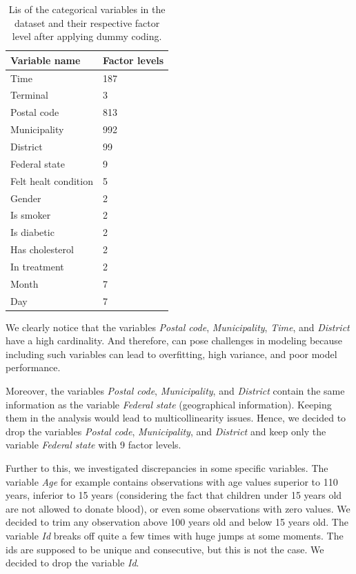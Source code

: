 \documentclass[12 pt]{scrartcl}
\numberwithin{equation}{section}
\begin{document}
\begin{table}[H]
    \centering
    \begin{tabular}{l||l}
    
    \textbf{Variable name} & \textbf{Factor levels} \\ \hline
    Time & 187 \\ \hline
    Terminal & 3 \\ \hline
    Postal code & 813 \\ \hline
    Municipality & 992 \\ \hline
    District & 99 \\ \hline
    Federal state & 9 \\ \hline
    Felt healt condition & 5 \\ \hline
    Gender & 2 \\ \hline
    Is smoker & 2 \\ \hline
    Is diabetic & 2 \\ \hline
    Has cholesterol & 2 \\ \hline
    In treatment & 2 \\ \hline
    Month & 7 \\ \hline
    Day & 7 \\ \hline

    \end{tabular}
    \caption{Lis of the categorical variables in the dataset and their respective factor level after applying dummy coding.}
    \label{tab:categorical}
    \end{table}

We clearly notice that the variables \textit{Postal code},  
\textit{Municipality}, \textit{Time}, and \textit{District} have a high cardinality.
And therefore, can pose challenges in modeling because including such variables can lead to overfitting, 
high variance, and poor model performance.

Moreover, the variables \textit{Postal code}, \textit{Municipality}, and \textit{District} 
contain the same information as the variable \textit{Federal state} (geographical information).
Keeping them in the analysis would lead to multicollinearity issues.
Hence, we decided to drop the variables \textit{Postal code}, \textit{Municipality}, and \textit{District} and
keep only the variable \textit{Federal state} with 9 factor levels.

Further to this, we investigated discrepancies in some specific variables.
The variable \textit{Age} for example contains observations with age values superior to 110 years,
inferior to 15 years (considering the fact that children under 15 years old are not allowed to donate blood),
or even some observations with zero values.
We decided to trim any observation above 100 years old and below 15 years old.
The variable \textit{Id} breaks off quite a few times with huge jumps at some moments.
The ids are supposed to be unique and consecutive, but this is not the case. We decided to drop the variable \textit{Id}.
\end{document}
